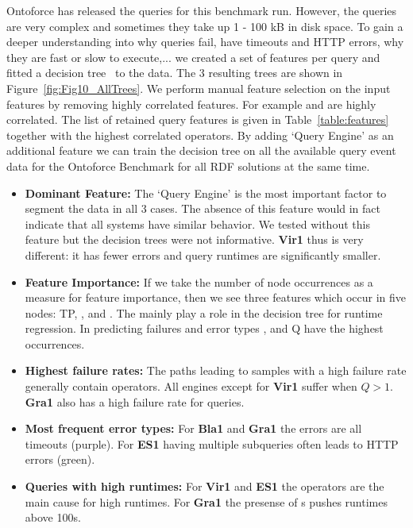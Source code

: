 \documentclass[twocolumn]{bmcart}%
\newcommand{\sql}[1]{\textsc{\scalebox{0.8}{#1}}}
\begin{document}
Ontoforce has released the queries for this benchmark run. However, the queries are very complex and sometimes they take up 1 - 100 kB in disk space. To gain a deeper understanding into why queries fail, have timeouts and HTTP errors, why they are fast or slow to execute,... we created a set of features per query and fitted a decision tree~\cite{sklearndtree} to the data. The 3 resulting trees are shown in Figure~\ref{fig:Fig10_AllTrees}. We perform manual feature selection on the input features by removing highly correlated features. For example \sql{order} and \sql{limit} are highly correlated. The list of retained query features is given in Table~\ref{table:features} together with the highest correlated operators.
By adding `Query Engine' as an additional feature we can train the decision tree on all the available query event data for the Ontoforce Benchmark for all RDF solutions at the same time. 
\begin{itemize}
	\item \textbf{Dominant Feature:} The `Query Engine' is the most important factor to segment the data in all 3 cases. The absence of this feature would in fact indicate that all systems have similar behavior. We tested without this feature but the decision trees were not informative. \textbf{Vir1} thus is very different: it has fewer errors and query runtimes are significantly smaller.
	\item \textbf{Feature Importance:} If we take the number of node occurrences as a measure for feature importance, then we see three features which occur in five nodes: TP, \sql{filter in}, and \sql{filter}. The \sql{filters} mainly play a role in the decision tree for runtime regression. In predicting failures and error types \sql{optional}, \sql{graph} and Q have the highest occurrences.
	\item \textbf{Highest failure rates:} The paths leading to samples with a high failure rate generally contain \sql{optional} operators. All engines except for \textbf{Vir1} suffer when $Q > 1$. \textbf{Gra1} also has a high failure rate for \sql{count} queries.
	\item \textbf{Most frequent error types:} For \textbf{Bla1} and \textbf{Gra1} the errors are all timeouts (purple). For \textbf{ES1} having multiple subqueries often leads to HTTP errors (green). 
	\item \textbf{Queries with high runtimes:} For \textbf{Vir1} and \textbf{ES1} the \sql{filter in} operators are the main cause for high runtimes. For \textbf{Gra1} the presense of \sql{filter}s pushes runtimes above 100s. 
\end{itemize}
\end{document}
